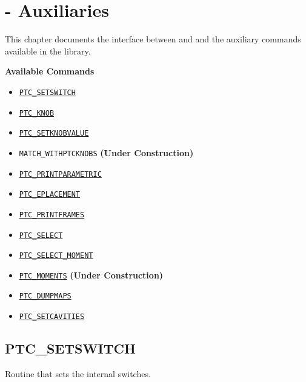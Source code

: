 
\chapter{{\madx}-{\ptc} Auxiliaries}
\label{chap:ptc-auxiliaries}

This chapter documents the interface between \madx and \ptc and the
auxiliary commands available in the \ptc library.

\textbf{Available Commands }
\begin{itemize}
   \item \hyperref[sec:ptc-setswitch]{\texttt{PTC\_SETSWITCH}}
   \item \hyperref[sec:ptc-knob]{\texttt{PTC\_KNOB}}
   \item \hyperref[sec:ptc-setknobvalue]{\texttt{PTC\_SETKNOBVALUE}}
   \item \texttt{MATCH\_WITHPTCKNOBS} \qquad \textbf{(Under Construction)} 
   \item \hyperref[sec:ptc-printparametric]{\texttt{PTC\_PRINTPARAMETRIC}}
   \item \hyperref[sec:ptc-eplacement]{\texttt{PTC\_EPLACEMENT}}
   \item \hyperref[sec:ptc-printframes]{\texttt{PTC\_PRINTFRAMES}}
   \item \hyperref[sec:ptc-select]{\texttt{PTC\_SELECT}}
   \item \hyperref[sec:ptc-select-moment]{\texttt{PTC\_SELECT\_MOMENT}}
   \item \hyperref[sec:ptc-moments]{\texttt{PTC\_MOMENTS}} \qquad \textbf{(Under Construction)} 
   \item \hyperref[sec:ptc-dumpmaps]{\texttt{PTC\_DUMPMAPS}}
   \item \hyperref[sec:ptc-setcavities]{\texttt{PTC\_SETCAVITIES}}
\end{itemize}

\newpage

\section{PTC\_SETSWITCH}
\label{sec:ptc-setswitch}

Routine that sets the internal \ptc switches.

